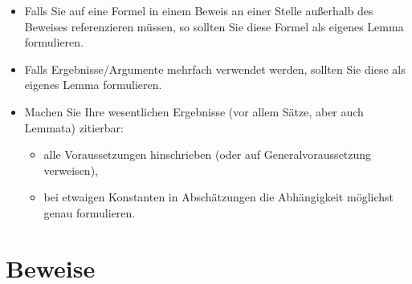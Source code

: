 \begin{itemize}
  \item Falls Sie auf eine Formel in einem Beweis an einer Stelle außerhalb des Beweises referenzieren müssen, so sollten Sie diese Formel als eigenes Lemma formulieren.

  \item Falls Ergebnisse/Argumente mehrfach verwendet werden, sollten Sie diese als eigenes Lemma formulieren.

  \item Machen Sie Ihre wesentlichen Ergebnisse (vor allem Sätze, aber auch Lemmata) zitierbar:
        \begin{itemize}
          \item alle Voraussetzungen hinschrieben (oder auf Generalvoraussetzung verweisen),
          \item bei etwaigen Konstanten in Abschätzungen die Abhängigkeit möglichst genau formulieren.
        \end{itemize}

\end{itemize}

\section{Beweise}

